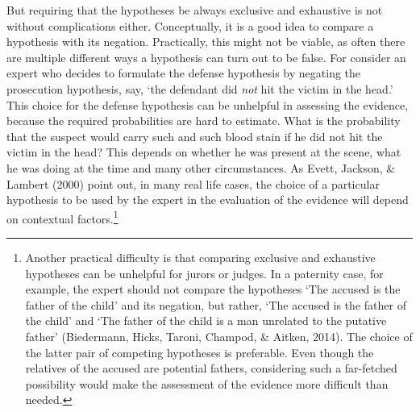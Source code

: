 \documentclass[
  10pt,
  dvipsnames,enabledeprecatedfontcommands]{scrartcl}
\begin{document}
But requiring that the hypotheses be always exclusive and exhaustive is
not without complications either. Conceptually, it is a good idea to
compare a hypothesis with its negation. Practically, this might not be
viable, as often there are multiple different ways a hypothesis can turn
out to be false. For consider an expert who decides to formulate the
defense hypothesis by negating the prosecution hypothesis, say, `the
defendant did \textit{not} hit the victim in the head.' This choice for
the defense hypothesis can be unhelpful in assessing the evidence,
because the required probabilities are hard to estimate. What is the
probability that the suspect would carry such and such blood stain if he
did not hit the victim in the head? This depends on whether he was
present at the scene, what he was doing at the time and many other
circumstances. As Evett, Jackson, \& Lambert (2000) point out, in many
real life cases, the choice of a particular hypothesis to be used by the
expert in the evaluation of the evidence will depend on contextual
factors.\footnote{Another practical difficulty is that comparing
  exclusive and exhaustive hypotheses can be unhelpful for jurors or
  judges. In a paternity case, for example, the expert should not
  compare the hypotheses `The accused is the father of the child' and
  its negation, but rather, `The accused is the father of the child' and
  `The father of the child is a man unrelated to the putative father'
  (Biedermann, Hicks, Taroni, Champod, \& Aitken, 2014). The choice of
  the latter pair of competing hypotheses is preferable. Even though the
  relatives of the accused are potential fathers, considering such a
  far-fetched possibility would make the assessment of the evidence more
  difficult than needed.}
\end{document}

